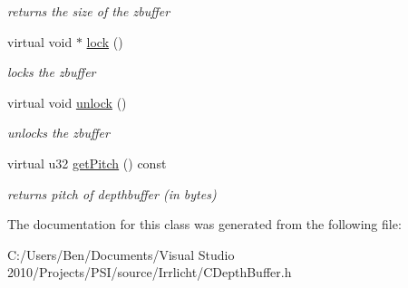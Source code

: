\begin{DoxyCompactItemize}
\begin{DoxyCompactList}\small\item\em returns the size of the zbuffer \end{DoxyCompactList}\item 
\hypertarget{classirr_1_1video_1_1_c_stencil_buffer_ac5128230b5f97a429f49d224232335e7}{virtual void $\ast$ \hyperlink{classirr_1_1video_1_1_c_stencil_buffer_ac5128230b5f97a429f49d224232335e7}{lock} ()}\label{classirr_1_1video_1_1_c_stencil_buffer_ac5128230b5f97a429f49d224232335e7}

\begin{DoxyCompactList}\small\item\em locks the zbuffer \end{DoxyCompactList}\item 
\hypertarget{classirr_1_1video_1_1_c_stencil_buffer_a89bba61fb2facbe588fbce272482937c}{virtual void \hyperlink{classirr_1_1video_1_1_c_stencil_buffer_a89bba61fb2facbe588fbce272482937c}{unlock} ()}\label{classirr_1_1video_1_1_c_stencil_buffer_a89bba61fb2facbe588fbce272482937c}

\begin{DoxyCompactList}\small\item\em unlocks the zbuffer \end{DoxyCompactList}\item 
\hypertarget{classirr_1_1video_1_1_c_stencil_buffer_a6f9a37a537230328741294dc9e393143}{virtual u32 \hyperlink{classirr_1_1video_1_1_c_stencil_buffer_a6f9a37a537230328741294dc9e393143}{get\-Pitch} () const }\label{classirr_1_1video_1_1_c_stencil_buffer_a6f9a37a537230328741294dc9e393143}

\begin{DoxyCompactList}\small\item\em returns pitch of depthbuffer (in bytes) \end{DoxyCompactList}\end{DoxyCompactItemize}


The documentation for this class was generated from the following file\-:\begin{DoxyCompactItemize}
\item 
C\-:/\-Users/\-Ben/\-Documents/\-Visual Studio 2010/\-Projects/\-P\-S\-I/source/\-Irrlicht/C\-Depth\-Buffer.\-h\end{DoxyCompactItemize}

